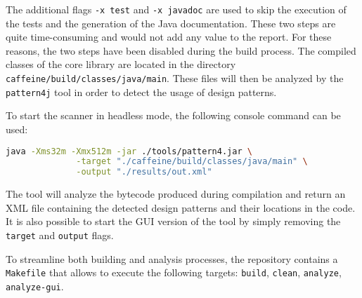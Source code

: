 \noindent The additional flags \texttt{-x test} and \texttt{-x javadoc} are used to skip the execution of the tests and the generation of the Java documentation. These two steps are quite time-consuming and would not add any value to the report. For these reasons, the two steps have been disabled during the build process. The compiled classes of the core library are located in the directory \texttt{caffeine/build/classes/java/main}. These files will then be analyzed by the \texttt{pattern4j} tool in order to detect the usage of design patterns.

To start the scanner in headless mode, the following console command can be used:

\begin{lstlisting}[language=bash, caption={Bash command to start the pattern4j design pattern analysis in headless mode}]
            java -Xms32m -Xmx512m -jar ./tools/pattern4.jar \
              -target "./caffeine/build/classes/java/main" \
              -output "./results/out.xml"
\end{lstlisting}

\noindent The tool will analyze the bytecode produced during compilation and return an XML file containing the detected design patterns and their locations in the code. It is also possible to start the GUI version of the tool by simply removing the \texttt{target} and \texttt{output} flags.

To streamline both building and analysis processes, the repository contains a \texttt{Makefile} that allows to execute the following targets: \texttt{build}, \texttt{clean}, \texttt{analyze}, \texttt{analyze-gui}.

